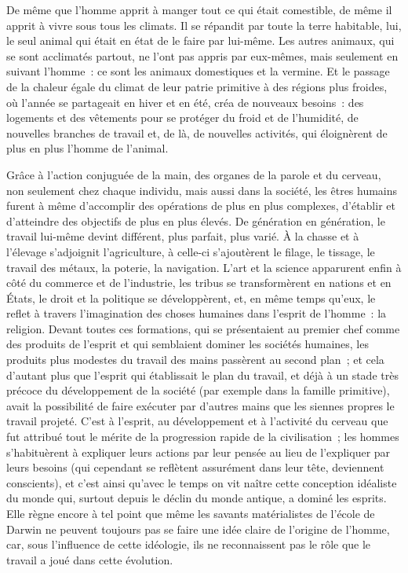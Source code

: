 \documentclass[french,twoside]{book} %
\begin{document}
De même que l’homme apprit à manger tout ce qui était comestible, de même il apprit à vivre sous tous les climats. Il se répandit par toute la terre habitable, lui, le seul animal qui était en état de le faire par lui-même. Les autres animaux, qui se sont acclimatés partout, ne l’ont pas appris par eux-mêmes, mais seulement en suivant l’homme : ce sont les animaux domestiques et la vermine. Et le passage de la chaleur égale du climat de leur patrie primitive à des régions plus froides, où l’année se partageait en hiver et en été, créa de nouveaux besoins : des logements et des vêtements pour se protéger du froid et de l’humidité, de nouvelles branches de travail et, de là, de nouvelles activités, qui éloignèrent de plus en plus l’homme de l’animal.\par
Grâce à l’action conjuguée de la main, des organes de la parole et du cerveau, non seulement chez chaque individu, mais aussi dans la société, les êtres humains furent à même d’accomplir des opérations de plus en plus complexes, d’établir et d’atteindre des objectifs de plus en plus élevés. De génération en génération, le travail lui-même devint différent, plus parfait, plus varié. À la chasse et à l’élevage s’adjoignit l’agriculture, à celle-ci s’ajoutèrent le filage, le tissage, le travail des métaux, la poterie, la navigation. L’art et la science apparurent enfin à côté du commerce et de l’industrie, les tribus se transformèrent en nations et en États, le droit et la politique se développèrent, et, en même temps qu’eux, le reflet à travers l’imagination des choses humaines dans l’esprit de l’homme : la religion. Devant toutes ces formations, qui se présentaient au premier chef comme des produits de l’esprit et qui semblaient dominer les sociétés humaines, les produits plus modestes du travail des mains passèrent au second plan ; et cela d’autant plus que l’esprit qui établissait le plan du travail, et déjà à un stade très précoce du développement de la société (par exemple dans la famille primitive), avait la possibilité de faire exécuter par d’autres mains que les siennes propres le travail projeté. C’est à l’esprit, au développement et à l’activité du cerveau que fut attribué tout le mérite de la progression rapide de la civilisation ; les hommes s’habituèrent à expliquer leurs actions par leur pensée au lieu de l’expliquer par leurs besoins (qui cependant se reflètent assurément dans leur tête, deviennent conscients), et c’est ainsi qu’avec le temps on vit naître cette conception idéaliste du monde qui, surtout depuis le déclin du monde antique, a dominé les esprits. Elle règne encore à tel point que même les savants matérialistes de l’école de Darwin ne peuvent toujours pas se faire une idée claire de l’origine de l’homme, car, sous l’influence de cette idéologie, ils ne reconnaissent pas le rôle que le travail a joué dans cette évolution.\par
\end{document}
